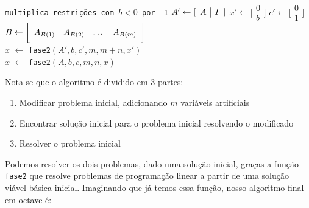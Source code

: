 \documentclass[12pt]{article}
\begin{document}
    \begin{algorithmic}
        \State \texttt{multiplica restrições com $b < 0$ por -1}
        \State $A' \gets [\begin{array}{c | c} A & I \end{array}]$
        \State $x' \gets \bigg [\begin{array}{c} 0 \\ \hline b \end{array} \bigg]$
        \State $c' \gets \bigg [\begin{array}{c} 0 \\ \hline 1 \end{array} \bigg]$
        \State $B \gets \bigg [\begin{array}{c c c c} A_{B(1)} & A_{B(2)} & \dots & A_{B(m)} \end{array} \bigg ]$ \\
        \State $x$ $\gets$ \texttt{fase2}$(A', b, c', m, m + n, x')$ \\
        \State $x$ $\gets$ \texttt{fase2}$(A, b, c, m, n, x)$ 
    \EndFunction
    \end{algorithmic}

    Nota-se que o algoritmo é dividido em 3 partes:
    \begin{enumerate}
        \item Modificar problema inicial, adicionando $m$ variáveis artificiais
        \item Encontrar solução inicial para o problema inicial resolvendo o modificado
        \item Resolver o problema inicial
    \end{enumerate}
    Podemos resolver os dois problemas, dado uma solução inicial, graças a função \texttt{fase2} que resolve problemas de programação linear a partir de uma solução viável básica inicial. Imaginando que já temos essa função, nosso algoritmo final em octave é:
\end{document}
